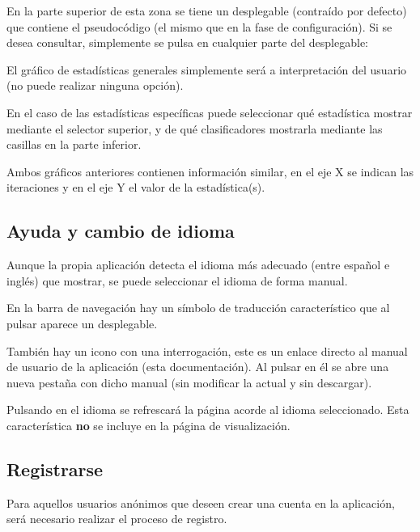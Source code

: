 
En la parte superior de esta zona se tiene un desplegable (contraído por
defecto) que contiene el pseudocódigo (el mismo que en la fase de
configuración). Si se desea consultar, simplemente se pulsa en cualquier parte
del desplegable:


El gráfico de estadísticas generales simplemente será a interpretación del
usuario (no puede realizar ninguna opción). 

En el caso de las estadísticas específicas puede seleccionar qué estadística
mostrar mediante el selector superior, y de qué clasificadores mostrarla
mediante las casillas en la parte inferior.

Ambos gráficos anteriores contienen información similar, en el eje X se indican
las iteraciones y en el eje Y el valor de la estadística(s).

\subsection{Ayuda y cambio de idioma}



Aunque la propia aplicación detecta el idioma más adecuado (entre español e
inglés) que mostrar, se puede seleccionar el idioma de forma manual.

En la barra de navegación hay un símbolo de traducción característico que al
pulsar aparece un desplegable.

También hay un icono con una interrogación, este es un enlace directo al manual
de usuario de la aplicación (esta documentación). Al pulsar en él se abre una
nueva pestaña con dicho manual (sin modificar la actual y sin descargar).


Pulsando en el idioma se refrescará la página acorde al idioma seleccionado.
Esta característica \textbf{no} se incluye en la página de visualización.

\subsection{Registrarse}

Para aquellos usuarios anónimos que deseen crear una cuenta en la aplicación,
será necesario realizar el proceso de registro.

